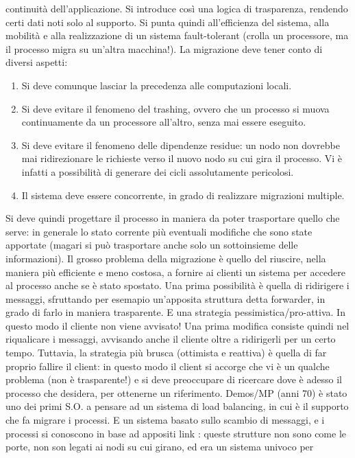 continuità dell'applicazione. Si introduce così una logica di trasparenza, rendendo certi dati noti solo al supporto. Si
punta quindi all'efficienza del sistema, alla mobilità e alla realizzazione di un sistema fault-tolerant (crolla un
processore, ma il processo migra su un'altra macchina!).
La migrazione deve tener conto di diversi aspetti:
\begin{enumerate}
 \item Si deve comunque lasciar la precedenza alle computazioni locali.
 \item Si deve evitare il fenomeno del trashing, ovvero che un processo si muova continuamente da un processore
 all'altro, senza mai essere eseguito.
 \item Si deve evitare il fenomeno delle dipendenze residue: un nodo non dovrebbe mai ridirezionare le richieste verso
 il nuovo nodo su cui gira il processo. Vi è infatti a possibilità di generare dei cicli assolutamente pericolosi.
 \item Il sistema deve essere concorrente, in grado di realizzare migrazioni multiple.
\end{enumerate}
Si deve quindi progettare il processo in maniera da poter trasportare quello che serve: in generale lo stato corrente
più eventuali modifiche che sono state apportate (magari si può trasportare anche solo un sottoinsieme delle
informazioni).
Il grosso problema della migrazione è quello del riuscire, nella maniera più efficiente e meno costosa, a fornire ai
clienti un sistema per accedere al processo anche se è stato spostato.
Una prima possibilità è quella di ridirigere i messaggi, sfruttando per esemapio un'apposita struttura detta forwarder,
in grado di farlo in maniera trasparente. E una strategia pessimistica/pro-attiva. In questo modo il cliente non viene
avvisato! Una prima modifica consiste quindi nel riqualicare i messaggi, avvisando anche il cliente oltre a ridirigerli
per un certo tempo.
Tuttavia, la strategia più brusca (ottimista e reattiva) è quella di far proprio fallire il client: in questo modo il
client si accorge che vi è un qualche problema (non è trasparente!) e si deve preoccupare di ricercare dove è adesso il
processo che desidera, per ottenerne un riferimento.
Demos/MP (anni 70) è stato uno dei primi S.O. a pensare ad un sistema di load balancing, in cui è il supporto che fa
migrare i processi. E un sistema basato sullo scambio di messaggi, e i processi si conoscono in base ad appositi
link : queste strutture non sono come le porte, non son legati ai nodi su cui girano, ed era un sistema univoco per
